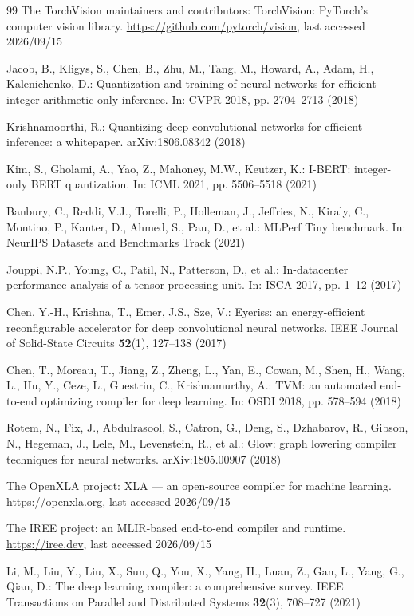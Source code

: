 \documentclass[runningheads]{llncs}
\begin{document}
\begin{thebibliography}{99}
The TorchVision maintainers and contributors: TorchVision: PyTorch's computer
vision library. \url{https://github.com/pytorch/vision}, last accessed 2026/09/15

Jacob, B., Kligys, S., Chen, B., Zhu, M., Tang, M., Howard, A., Adam, H.,
Kalenichenko, D.: Quantization and training of neural networks for efficient
integer-arithmetic-only inference. In: CVPR 2018, pp. 2704--2713 (2018)

Krishnamoorthi, R.: Quantizing deep convolutional networks for efficient
inference: a whitepaper. arXiv:1806.08342 (2018)

Kim, S., Gholami, A., Yao, Z., Mahoney, M.W., Keutzer, K.: I-BERT: integer-only
BERT quantization. In: ICML 2021, pp. 5506--5518 (2021)

Banbury, C., Reddi, V.J., Torelli, P., Holleman, J., Jeffries, N., Kiraly, C.,
Montino, P., Kanter, D., Ahmed, S., Pau, D., et al.: MLPerf Tiny benchmark. In:
NeurIPS Datasets and Benchmarks Track (2021)

Jouppi, N.P., Young, C., Patil, N., Patterson, D., et al.: In-datacenter
performance analysis of a tensor processing unit. In: ISCA 2017, pp. 1--12 (2017)

Chen, Y.-H., Krishna, T., Emer, J.S., Sze, V.: Eyeriss: an energy-efficient
reconfigurable accelerator for deep convolutional neural networks. IEEE Journal
of Solid-State Circuits \textbf{52}(1), 127--138 (2017)

Chen, T., Moreau, T., Jiang, Z., Zheng, L., Yan, E., Cowan, M., Shen, H., Wang,
L., Hu, Y., Ceze, L., Guestrin, C., Krishnamurthy, A.: TVM: an automated
end-to-end optimizing compiler for deep learning. In: OSDI 2018, pp. 578--594
(2018)

Rotem, N., Fix, J., Abdulrasool, S., Catron, G., Deng, S., Dzhabarov, R.,
Gibson, N., Hegeman, J., Lele, M., Levenstein, R., et al.: Glow: graph lowering
compiler techniques for neural networks. arXiv:1805.00907 (2018)

The OpenXLA project: XLA --- an open-source compiler for machine learning.
\url{https://openxla.org}, last accessed 2026/09/15

The IREE project: an MLIR-based end-to-end compiler and runtime.
\url{https://iree.dev}, last accessed 2026/09/15

Li, M., Liu, Y., Liu, X., Sun, Q., You, X., Yang, H., Luan, Z., Gan, L., Yang,
G., Qian, D.: The deep learning compiler: a comprehensive survey. IEEE
Transactions on Parallel and Distributed Systems \textbf{32}(3), 708--727 (2021)


\end{thebibliography}
\end{document}
